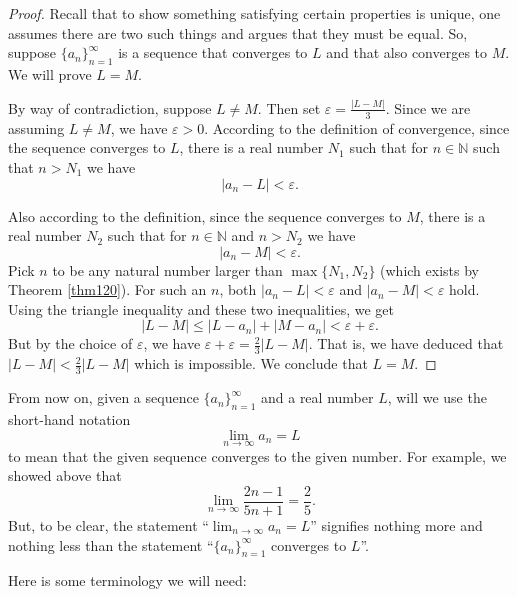\documentclass[12pt]{amsart}
\def\e{\varepsilon}
\newcommand{\N}{\mathbb{N}}
\numberwithin{equation}{section}
\theoremstyle{plain} %
\theoremstyle{definition}
\theoremstyle{remark}
\begin{document}
\begin{proof} Recall that to show something satisfying certain properties is unique, one assumes there are two such things and argues that they must be equal. 
So,
suppose $\{a_n\}_{n=1}^\infty$ is a sequence that converges to $L$ and that also converges to $M$. We will prove $L = M$. 

By way of contradiction, suppose $L \ne M$. Then set $\e =
\frac{|L-M|}{3}$. Since we are assuming $L \ne M$, we have $\e > 0$.  
According to the definition of convergence, since the sequence converges to $L$, there is a real number $N_1$ such that for $n \in \N$ such that  $n > N_1$ we have
$$
|a_n - L| < \e.
$$

Also according to the definition, since the sequence converges to $M$, there is a real number $N_2$ such that for $n \in \N$ and  $n > N_2$ we have
$$
|a_n - M| < \e.
$$
Pick $n$ to be any natural number larger than $\max\{N_1, N_2\}$ (which exists by Theorem \ref{thm120}).   For such an $n$, both
$|a_n - L| < \e$ and $ |a_n - M| < \e$ hold. 
Using the triangle inequality and these two inequalities, we get
$$
|L-M| \leq |L-a_n| + |M-a_n| < \e + \e.
$$
But by the choice of $\e$, we have $\e + \e = \frac23 |L-M|$. That is, we have deduced that $|L-M| < \frac23 |L-M|$ which is impossible.
We conclude that $L = M$. 
\end{proof}




From now on, given a sequence $\{a_n\}_{n=1}^\infty$ and a real number $L$, 
will we use the short-hand notation
$$
\lim_{n \to \infty} a_n = L
$$
to mean that the given sequence converges to the given number. For example, we showed above that 
$$
\lim_{n \to \infty} \frac{2n - 1}{5n + 1}   = \frac25.
$$
But, to be clear, the statement ``$\lim_{n \to \infty} a_n = L$''
signifies nothing more and nothing less than the statement
``$\{a_n\}_{n=1}^\infty$ converges to $L$''.



Here is some terminology we will need:
\end{document}
